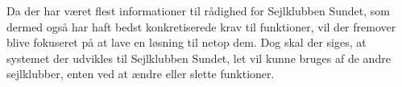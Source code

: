 Da der har været flest informationer til rådighed for Sejlklubben Sundet, som dermed også har haft bedst
konkretiserede krav til funktioner, vil der fremover blive fokuseret på at lave en løsning til netop dem. 
Dog skal der siges, at systemet der udvikles til Sejlklubben Sundet, let vil kunne bruges af de andre sejlklubber, enten ved at ændre eller slette funktioner.
